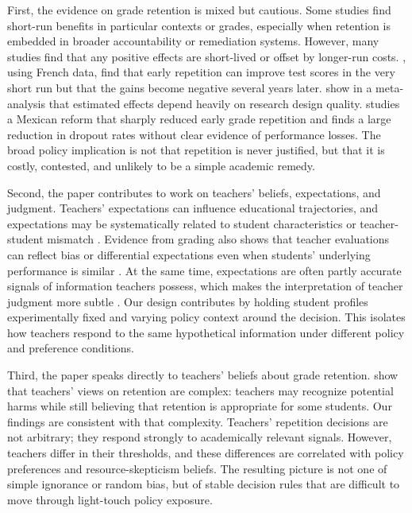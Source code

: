 \documentclass[12pt,a4paper]{article}
\begin{document}
First, the evidence on grade retention is mixed but cautious. Some studies find short-run benefits in particular contexts or grades, especially when retention is embedded in broader accountability or remediation systems. However, many studies find that any positive effects are short-lived or offset by longer-run costs. \citet{alet2013}, using French data, find that early repetition can improve test scores in the very short run but that the gains become negative several years later. \citet{allen2009} show in a meta-analysis that estimated effects depend heavily on research design quality. \citet{cabrera2022} studies a Mexican reform that sharply reduced early grade repetition and finds a large reduction in dropout rates without clear evidence of performance losses. The broad policy implication is not that repetition is never justified, but that it is costly, contested, and unlikely to be a simple academic remedy.

Second, the paper contributes to work on teachers' beliefs, expectations, and judgment. Teachers' expectations can influence educational trajectories, and expectations may be systematically related to student characteristics or teacher-student mismatch \citep{gershenson2016,papageorge2020}. Evidence from grading also shows that teacher evaluations can reflect bias or differential expectations even when students' underlying performance is similar \citep{hanna2012}. At the same time, expectations are often partly accurate signals of information teachers possess, which makes the interpretation of teacher judgment more subtle \citep{jussim2005}. Our design contributes by holding student profiles experimentally fixed and varying policy context around the decision. This isolates how teachers respond to the same hypothetical information under different policy and preference conditions.

Third, the paper speaks directly to teachers' beliefs about grade retention. \citet{tomchin1992} show that teachers' views on retention are complex: teachers may recognize potential harms while still believing that retention is appropriate for some students. Our findings are consistent with that complexity. Teachers' repetition decisions are not arbitrary; they respond strongly to academically relevant signals. However, teachers differ in their thresholds, and these differences are correlated with policy preferences and resource-skepticism beliefs. The resulting picture is not one of simple ignorance or random bias, but of stable decision rules that are difficult to move through light-touch policy exposure.
\end{document}
